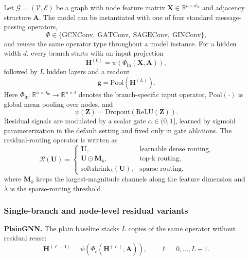 Let $\mathcal{G}=(\mathcal{V},\mathcal{E})$ be a graph with node feature matrix $\mathbf{X}\in\mathbb{R}^{n\times d_{\mathrm{in}}}$ and adjacency structure $\mathbf{A}$. The model can be instantiated with one of four standard message-passing operators,
\[
\Phi \in \{\mathrm{GCNConv},\ \mathrm{GATConv},\ \mathrm{SAGEConv},\ \mathrm{GINConv}\},
\]
and reuses the same operator type throughout a model instance. For a hidden width $d$, every branch starts with an input projection
\begin{equation}
\mathbf{H}^{(0)} = \psi\!\left(\Phi_{\mathrm{in}}(\mathbf{X}, \mathbf{A})\right),
\end{equation}
followed by $L$ hidden layers and a readout
\begin{equation}
\mathbf{g} = \mathrm{Pool}\!\left(\mathbf{H}^{(L)}\right).
\end{equation}
Here $\Phi_{\mathrm{in}}:\mathbb{R}^{n\times d_{\mathrm{in}}}\rightarrow\mathbb{R}^{n\times d}$ denotes the branch-specific input operator, $\mathrm{Pool}(\cdot)$ is global mean pooling over nodes, and
\begin{equation}
\psi(\mathbf{Z}) = \mathrm{Dropout}\!\left(\mathrm{ReLU}(\mathbf{Z})\right).
\end{equation}
Residual signals are modulated by a scalar gate $\alpha\in(0,1]$, learned by sigmoid parameterization in the default setting and fixed only in gate ablations. The residual-routing operator is written as
\begin{equation}
\mathcal{R}(\mathbf{U}) =
\begin{cases}
\mathbf{U}, & \text{learnable dense routing}, \\
\mathbf{U}\odot \mathbf{M}_{k}, & \text{top-k routing}, \\
\mathrm{softshrink}_{\lambda}(\mathbf{U}), & \text{sparse routing},
\end{cases}
\end{equation}
where $\mathbf{M}_{k}$ keeps the largest-magnitude channels along the feature dimension and $\lambda$ is the sparse-routing threshold.

\subsubsection{Single-branch and node-level residual variants}

\textbf{PlainGNN.} The plain baseline stacks $L$ copies of the same operator without residual reuse:
\begin{equation}
\mathbf{H}^{(\ell+1)} = \psi\!\left(\Phi_{\ell}\!\left(\mathbf{H}^{(\ell)}, \mathbf{A}\right)\right), \qquad \ell=0,\dots,L-1.
\end{equation}

